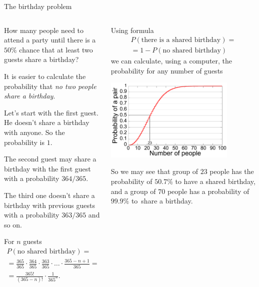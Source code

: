 \documentclass[9pt,aspectratio=169]{beamer}
\begin{document}
\begin{frame}{The birthday problem}
  \begin{columns}[T]
    \begin{column}{0.5\textwidth}
      \begin{problem}
        How many people need to attend a party until there is a $50\%$ chance that at least two guests share a birthday?
      \end{problem}
      It is easier to calculate the probability that \emph{no two people share a birthday}. 
      
      Let's start with the first guest. He doesn't share a birthday with anyone. So the probability is $1$.
      
      The second guest may share a birthday with the first guest with a probability $364/365$. 
      
      The third one doesn't share a birthday with previous guests with a probability $363/365$ and so on. 
      
      For $n$ guests
      \begin{multline*}
        P(\text{no shared birthday}) = \\
        = \frac{365}{365} \cdot \frac{364}{365} \cdot \frac{363}{365} \cdot \ldots \cdot \frac{365 - n + 1}{365} = \\ = \frac{365!}{(365-n)!} \cdot \frac{1}{365^n}.
      \end{multline*}
    \end{column}
    \begin{column}{0.5\textwidth}
      Using formula 
      \begin{multline*}
         P(\text{there is a shared birthday}) = \\ 
         = 1 - P(\text{no shared birthday})
      \end{multline*}
      we can calculate, using a computer, the probability for any number of guests
      \begin{center}
        \vspace*{-1ex}   
        \includegraphics[width = 0.80\textwidth]{03 - Probability/Birthday_Paradox.pdf}
        \vspace*{-1ex}   
      \end{center} 
      So we may see that group of $23$ people has the probability of $50.7\%$ to have a shared birthday, and a group of $70$ people has a probability of $99.9\%$ to~share a birthday.
    \end{column}
  \end{columns}
\end{frame}
\end{document}
